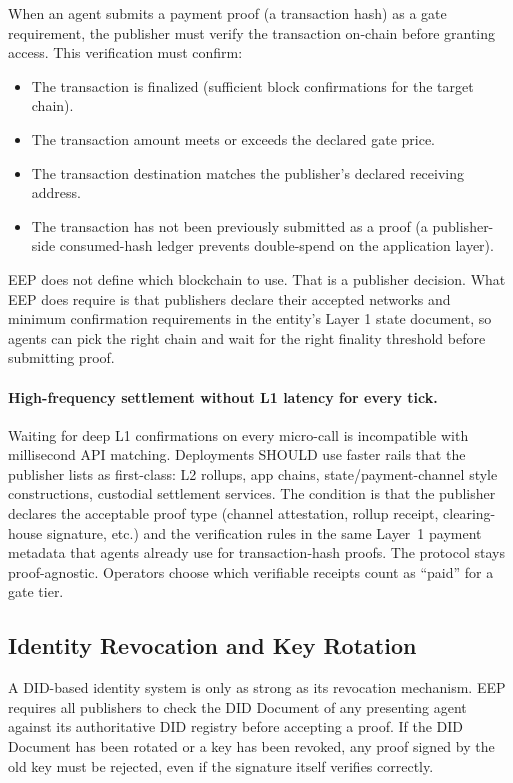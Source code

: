\documentclass[12pt,a4paper]{article}
\begin{document}
When an agent submits a payment proof (a transaction hash) as a gate requirement, the publisher must verify the transaction on-chain before granting access. This verification must confirm:

\begin{itemize}
    \item The transaction is finalized (sufficient block confirmations for the target chain).
    \item The transaction amount meets or exceeds the declared gate price.
    \item The transaction destination matches the publisher's declared receiving address.
    \item The transaction has not been previously submitted as a proof (a publisher-side consumed-hash ledger prevents double-spend on the application layer).
\end{itemize}

EEP does not define which blockchain to use. That is a publisher decision. What EEP does require is that publishers declare their accepted networks and minimum confirmation requirements in the entity's Layer 1 state document, so agents can pick the right chain and wait for the right finality threshold before submitting proof.

\paragraph{High-frequency settlement without L1 latency for every tick.}
Waiting for deep L1 confirmations on every micro-call is incompatible with millisecond API matching. Deployments SHOULD use faster rails that the publisher lists as first-class: L2 rollups, app chains, state/payment-channel style constructions, custodial settlement services. The condition is that the publisher declares the acceptable proof type (channel attestation, rollup receipt, clearing-house signature, etc.) and the verification rules in the same Layer~1 payment metadata that agents already use for transaction-hash proofs. The protocol stays proof-agnostic. Operators choose which verifiable receipts count as ``paid'' for a gate tier.

\subsection{Identity Revocation and Key Rotation}

A DID-based identity system is only as strong as its revocation mechanism. EEP requires all publishers to check the DID Document of any presenting agent against its authoritative DID registry before accepting a proof. If the DID Document has been rotated or a key has been revoked, any proof signed by the old key must be rejected, even if the signature itself verifies correctly.
\end{document}
